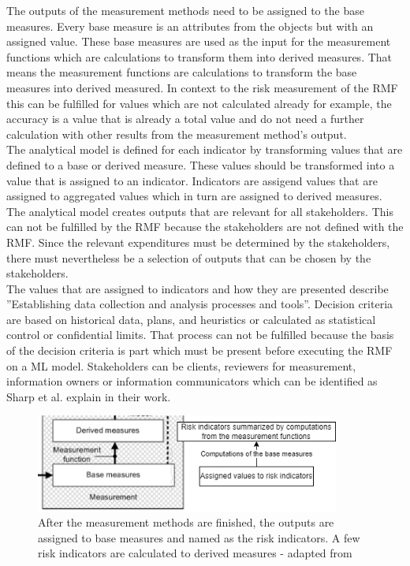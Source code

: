 The outputs of the measurement methods need to be assigned to the base measures. Every base measure is an attributes from the objects but with
an assigned value. These base measures are used as the input for the measurement functions which are calculations to transform them into derived measures. That means the measurement functions are
calculations to transform the base measures into derived measured. In context to the risk measurement of the RMF this can be fulfilled for values which are not calculated already for example, the
accuracy is a value that is already a total value \cite{9783960101925} and do not need a further calculation with other results from the measurement method's output. \\ The analytical model is defined for each indicator by transforming values that are defined to a base or derived measure. These values should be transformed into a value that is assigned to an indicator. Indicators are assigend values that are assigned to aggregated values which in turn are assigned to derived measures. The analytical model creates outputs that are relevant for all stakeholders. This can not be fulfilled by the RMF because the stakeholders are not defined with the RMF. Since the relevant expenditures must be determined by the stakeholders, there must nevertheless be a selection of outputs that can be chosen by the stakeholders. \\ The values that are assigned to indicators and how they are presented describe ''Establishing data collection and analysis processes and tools''. Decision criteria are based on historical data, plans, and heuristics or calculated as statistical control or confidential limits. That process can not be fulfilled because the basis of the decision criteria is part which must be present before executing the RMF on a ML model. Stakeholders can be clients, reviewers for measurement, information owners or information communicators \cite{ISO_27004_2009} which can be identified as
Sharp et al. \cite{DBLP:conf/dexaw/SharpFG99} explain in their work.

\begin{figure}[ht!]
  \centering
  \includegraphics[width=10cm]{pictures/base_to_derived_measure.png}
  \caption{After the measurement methods are finished, the outputs are assigned to base measures and named as the risk indicators. A few risk indicators are calculated to derived measures - adapted from \cite{ISO_27004_2009}}
  \label{fig:base_to_derived_measure}
\end{figure}

